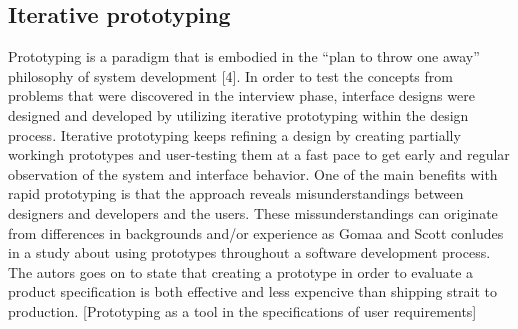 \subsection{Iterative prototyping}
Prototyping is a paradigm that is embodied in the “plan to throw one
away” philosophy of system development [4].
In order to test the concepts from problems that were discovered in the interview phase, interface designs were designed and developed by utilizing iterative prototyping within the design process. Iterative prototyping keeps refining a design by creating partially workingh prototypes and user-testing them at a fast pace to get early and regular observation of the system and interface behavior. One of the main benefits with rapid prototyping is that the approach reveals misunderstandings between
designers and developers and the users. These missunderstandings can originate from
 differences in backgrounds and/or experience as Gomaa and Scott conludes in a study about using prototypes throughout a software development process. The autors goes on to state that creating a prototype in order to evaluate a product specification is both effective and less expencive than shipping strait to production.
[Prototyping as
a tool in the specifications of user requirements]
